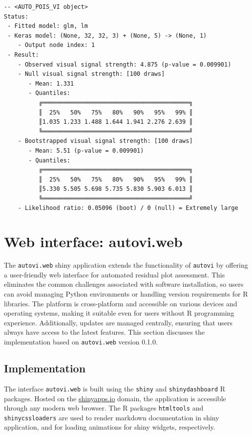 \documentclass[
doublespace,
  times]{anzsauth}
\begin{document}
\begin{verbatim}
\end{verbatim}

\begin{verbatim}
-- <AUTO_POIS_VI object>
Status:
 - Fitted model: glm, lm
 - Keras model: (None, 32, 32, 3) + (None, 5) -> (None, 1)
    - Output node index: 1
 - Result:
    - Observed visual signal strength: 4.875 (p-value = 0.009901)
    - Null visual signal strength: [100 draws]
       - Mean: 1.331
       - Quantiles: 
          ╔══════════════════════════════════════════╗
          ║  25%   50%   75%   80%   90%   95%   99% ║
          ║1.035 1.233 1.488 1.644 1.941 2.276 2.639 ║
          ╚══════════════════════════════════════════╝
    - Bootstrapped visual signal strength: [100 draws]
       - Mean: 5.51 (p-value = 0.009901)
       - Quantiles: 
          ╔══════════════════════════════════════════╗
          ║  25%   50%   75%   80%   90%   95%   99% ║
          ║5.330 5.505 5.698 5.735 5.830 5.903 6.013 ║
          ╚══════════════════════════════════════════╝
    - Likelihood ratio: 0.05096 (boot) / 0 (null) = Extremely large 
\end{verbatim}

\section{Web interface: autovi.web}\label{sec-autovi-web}

The \texttt{autovi.web} shiny application extends the functionality of
\texttt{autovi} by offering a user-friendly web interface for automated
residual plot assessment. This eliminates the common challenges
associated with software installation, so users can avoid managing
Python environments or handling version requirements for R libraries.
The platform is cross-platform and accessible on various devices and
operating systems, making it suitable even for users without R
programming experience. Additionally, updates are managed centrally,
ensuring that users always have access to the latest features. This
section discusses the implementation based on \texttt{autovi.web}
version 0.1.0.

\subsection{Implementation}\label{implementation}

The interface \texttt{autovi.web} is built using the \texttt{shiny}
\citep{shiny} and \texttt{shinydashboard} \citep{shinydashboard} R
packages. Hosted on the \href{https://www.shinyapps.io}{shinyapps.io}
domain, the application is accessible through any modern web browser.
The R packages \texttt{htmltools} \citep{htmltools} and
\texttt{shinycssloaders} \citep{shinycssloaders} are used to render
markdown documentation in shiny application, and for loading animations
for shiny widgets, respectively.
\end{document}
